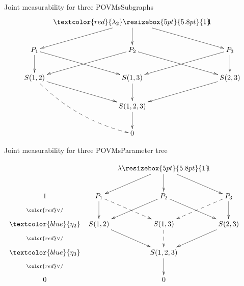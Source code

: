 \documentclass[mathserif,handout]{beamer}
\newcommand{\bbone}{\ensuremath{\resizebox{5pt}{5.8pt}{1}\hspace{-3.5pt}1}}
\begin{document}
\begin{frame}{Joint measurability for three POVMs}{Subgraphs}
$$\xymatrix@C=2mm{
&&&\textcolor{red}{\lambda_{2} }\bbone\ar@[red][dl]\ar@[gray][dr]\ar@[red][d]&&&\\
&&P_{1}\ar@[gray][dr]\ar@[red][d]&P_{2}\ar@[red][dl]\ar@[gray][dr]&P_{3}\ar@[gray][d]\ar@[gray][dl]&&\\
&&S(1,2)\ar@{-->}@[red]@/^-1pc/[ddr]\ar@[gray][dr]&S(1,3)\ar@[gray][d]&S(2,3)\ar@[gray][dl]&&\\
&&&S(1,2,3)\ar@[gray][d]&&&\\
&&&0&&&\\
}
$$
\end{frame}



\begin{frame}{Joint measurability for three POVMs}{Parameter tree}

$$\xymatrix@C=2mm{
&&\lambda \bbone\ar[dl]\ar[dr]\ar[d]&&&\\
1\ar@{}[d]|{\color{red}\vee /}&P_{1}\ar@{-->}[dr]\ar[d]&P_{2}\ar[dl]\ar[dr]&P_{3}\ar[d]\ar@{-->}[dl]&&\\
\textcolor{blue}{\eta_{2}}\ar@{}[d]|{\color{red}\vee /}&S(1,2)\ar[dr]&S(1,3)\ar@{-->}[d]&S(2,3)\ar[dl]&&\\
\textcolor{blue}{\eta_{3}}\ar@{}[d]|{\color{red}\vee /}&&S(1,2,3)\ar[d]&&&\\
0&&0&&&\\
}$$


\end{frame}
\end{document}
